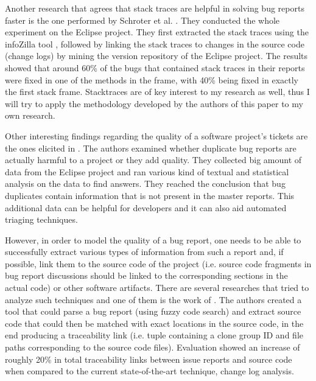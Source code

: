 \documentclass[11pt,english,twocolumn]{article}
\begin{document}
Another research that agrees that stack traces are helpful in solving bug
reports faster is the one performed by Schroter et al. \cite{schroter2010stack}. They conducted
the whole experiment on the Eclipse project. They first extracted the stack
traces using the infoZilla tool \cite{bettenburg2008extracting}, followed by
linking the stack traces to changes in the source code (change logs) by mining
the version repository of the Eclipse project. The results showed that 
around 60\% of the bugs that contained stack traces in their reports were fixed
in one of the methods in the frame, with 40\% being fixed in exactly the first
stack frame. Stacktraces are of key interest to my research as well, thus I will 
try to apply the methodology developed by the authors of this paper to my
own research. 

Other interesting findings regarding the quality of a software project's tickets
are the ones elicited in \cite{bettenburg2008duplicate}. The authors examined
whether duplicate bug reports are actually harmful to a project or they add 
quality. They collected big amount of data from the Eclipse project and ran
various kind of textual and statistical analysis on the data to find answers.
They reached the conclusion that bug duplicates contain information that is not
present in the master reports. This additional data can be helpful for developers
and it can also aid automated triaging techniques.

However, in order to model the quality of a bug report, one needs to be able to
successfully extract various types of information from such a report and, if 
possible, link them to the source code of the project (i.e. source code fragments
in bug report discussions should be linked to the corresponding sections in the 
actual code) or other software artifacts. There are several researches that tried 
to analyze such techniques and one of them is the work of 
\cite{bettenburg2012using}. The authors created a tool that could parse a bug 
report (using fuzzy code search) and extract source code that could then be
matched with exact locations in the source code, in the end producing a 
traceability link (i.e. tuple containing a clone group ID and file paths 
corresponding to the source code files). Evaluation showed an increase of
roughly 20\% in total traceability links between issue reports and source code 
when compared to the current state-of-the-art technique, change log analysis.
\end{document}
